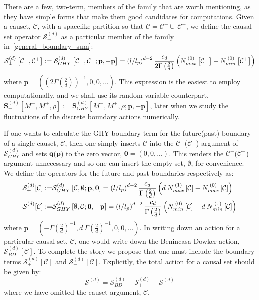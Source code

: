 \documentclass[12pt]{article}
\newcommand{\be}{\begin{equation}}
\newcommand{\ee}{\end{equation}}
\begin{document}
There are a few, two-term, members of the family that are worth mentioning, as they have simple forms that make them good candidates for computations. Given a causet, $\mathcal{C}$, with a spacelike partition so that $\mathcal C = \mathcal C^+ \cup\, \mathcal C^-$, we define the causal set operator $\mathcal{S}^{(d)}_{\pm}$ as a particular member of the family in~\eqref{general_boundary_sum}:
\be\label{eq:min_max_simple_formula}
\mathcal{S}^{(d)}_{\pm}\left[\mathcal{C}^-,\mathcal{C}^+\right]:=\mathcal{S}^{(d)}_{GHY}\left[\mathcal{C}^-,\mathcal{C}^+;\mathbf{p}, -\mathbf{p} \right]=\left(l/l_p\right)^{d-2}\frac{c_{d}}{2\Gamma\left(\frac{2}{d} \right)}\left( N_{\vphantom{i}max}^{\: (0)}\left[\mathcal{C}^- \right] - N_{min}^{\: (0)}\left[\mathcal{C}^+ \right] \right)
\ee
where $\mathbf{p}=\left(\left(2\Gamma\left(\frac{2}{d} \right)\right)^{-1},0,0,...\right)$.
This expression is the easiest to employ computationally, and we shall use its random variable counterpart, $\textbf{S}^{(d)}_{\pm}\left[M^-,M^+,\rho\right]:=\textbf{S}^{(d)}_{GHY}\left[M^-,M^+,\rho;\mathbf{p}, -\mathbf{p} \right]$, later when we study the fluctuations of the discrete boundary actions numerically.

If one wants to calculate the GHY boundary term for the future(past) boundary of a single causet, $\mathcal{C}$, then one simply inserts $\mathcal{C}$ into the $\mathcal{C}^-$($\mathcal{C}^+$) argument of $\mathcal{S}^{(d)}_{GHY}$ and sets $\mathbf{q}$($\mathbf{p}$) to the zero vector, $\mathbf{0}=(0,0,...)$. This renders the $\mathcal{C}^+$($\mathcal{C}^-$) argument unnecessary and so one can insert the empty set, $\emptyset$, for convenience. We define the operators for the future and past boundaries respectively as:
\begin{align}\label{eq:future_past_boundary_terms1}
\mathcal{S}^{(d)}_{+}[\mathcal{C}]:= & \mathcal{S}^{(d)}_{GHY}\left[\mathcal{C},\emptyset;\mathbf{p},\mathbf{0}\right] =\left(l/l_p\right)^{d-2}\frac{c_{d}}{\Gamma\left(\frac{2}{d} \right)}\left( d\:N_{\vphantom{i}max}^{\: (1)}\left[\mathcal{C} \right] - N_{\vphantom{i}max}^{\: (0)}\left[\mathcal{C} \right] \right)
\\
\label{eq:future_past_boundary_terms2}
\mathcal{S}^{(d)}_{-}[\mathcal{C}]:= & \mathcal{S}^{(d)}_{GHY}\left[\emptyset,\mathcal{C};\mathbf{0},-\mathbf{p}\right] =\left(l/l_p\right)^{d-2}\frac{c_{d}}{\Gamma\left(\frac{2}{d} \right)}\left( N_{min}^{\: (0)}\left[\mathcal{C} \right] - d\: N_{min}^{\: (1)}\left[\mathcal{C} \right] \right)
\end{align}
where $\mathbf{p}=\left(-\Gamma\left(\frac{2}{d} \right)^{-1},d\:\Gamma\left(\frac{2}{d} \right)^{-1},0,0,...\right)$. In writing down an action for a particular causal set, $\mathcal{C}$, one would write down the Benincasa-Dowker action, $\mathcal{S}^{(d)}_{BD}[\mathcal{C}]$. To complete the story we propose that one must include the boundary terms $\mathcal{S}^{(d)}_{+}[\mathcal{C}]$ and $\mathcal{S}^{(d)}_{-}[\mathcal{C}]$. Explicitly, the total action for a causal set should be given by:
\be\label{eq:total_causet_action}
\mathcal{S}^{(d)}=\mathcal{S}^{(d)}_{BD}+\mathcal{S}^{(d)}_{+}-\mathcal{S}^{(d)}_{-}
\ee
where we have omitted the causet argument, $\mathcal{C}$.
\end{document}

